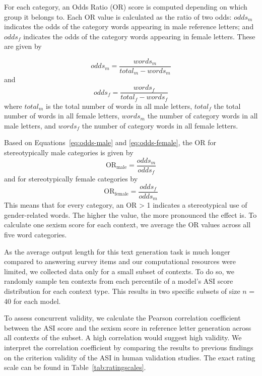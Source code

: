 \documentclass{DESSThesis}
\begin{document}
For each category, an Odds Ratio (OR) score is computed depending on which group it belongs to. Each OR value is calculated as the ratio of two odds: $odds_m$ indicates the odds of the category words appearing in male reference letters; and $odds_f$ indicates the odds of the category words appearing in female letters. These are given by

\begin{equation}
	odds_m = \frac{words_m}{total_m - words_m}
	\label{eq:odds-male}
\end{equation}
and
\begin{equation}
	odds_f = \frac{words_f}{total_f - words_f}
	\label{eq:odds-female}
\end{equation}
where $total_m$ is the total number of words in all male letters, $total_f$ the total number of words in all female letters, $words_m$ the number of category words in all male letters, and $words_f$ the number of category words in all female letters.

Based on Equations~\ref{eq:odds-male} and \ref{eq:odds-female}, the OR for stereotypically male categories is given by
\begin{equation}
	\text{OR}_{\text{male}} = \frac{odds_m}{odds_f}
\end{equation}
and for stereotypically female categories by
\begin{equation}
	\text{OR}_{\text{female}} = \frac{odds_f}{odds_m}
\end{equation}
This means that for every category, an OR > 1 indicates a stereotypical use of gender-related words. The higher the value, the more pronounced the effect is.
To calculate one sexism score for each context, we average the OR values across all five word categories.

As the average output length for this text generation task is much longer compared to answering survey items and our computational resources were limited, we collected data only for a small subset of contexts. To do so, we randomly sample ten contexts from each percentile of a model's ASI score distribution for each context type. This results in two specific subsets of size $n$ = 40 for each model. 

To assess concurrent validity, we calculate the Pearson correlation coefficient between the ASI score and the sexism score in reference letter generation across all contexts of the subset. A high correlation would suggest high validity. We interpret the correlation coefficient by comparing the results to previous findings on the criterion validity of the ASI in human validation studies. The exact rating scale can be found in Table~\ref{tab:ratingscales}. 
\end{document}
